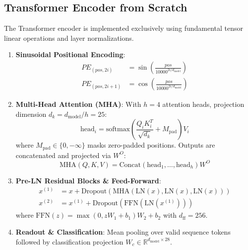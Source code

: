 \documentclass[10pt,twocolumn,letterpaper]{article}
\begin{document}
\subsection{Transformer Encoder from Scratch}
The Transformer encoder is implemented exclusively using fundamental tensor linear operations and layer normalizations.
\begin{enumerate}
    \item \textbf{Sinusoidal Positional Encoding}:
    \begin{align}
    PE_{(pos, 2i)} &= \sin\left(\frac{pos}{10000^{2i/d_{\text{model}}}}\right) \\
    PE_{(pos, 2i+1)} &= \cos\left(\frac{pos}{10000^{2i/d_{\text{model}}}}\right)
    \end{align}
    \item \textbf{Multi-Head Attention (MHA)}: With $h=4$ attention heads, projection dimension $d_k = d_{\text{model}}/h = 25$:
    \begin{equation}
    \text{head}_i = \text{softmax}\left(\frac{Q_i K_i^T}{\sqrt{d_k}} + M_{\text{pad}}\right) V_i
    \end{equation}
    where $M_{\text{pad}} \in \{0, -\infty\}$ masks zero-padded positions. Outputs are concatenated and projected via $W^O$:
    \begin{equation}
    \text{MHA}(Q, K, V) = \text{Concat}(\text{head}_1, \dots, \text{head}_h) W^O
    \end{equation}
    \item \textbf{Pre-LN Residual Blocks \& Feed-Forward}:
    \begin{align}
    x^{(1)} &= x + \text{Dropout}(\text{MHA}(\text{LN}(x), \text{LN}(x), \text{LN}(x))) \\
    x^{(2)} &= x^{(1)} + \text{Dropout}(\text{FFN}(\text{LN}(x^{(1)})))
    \end{align}
    where $\text{FFN}(z) = \max(0, z W_1 + b_1) W_2 + b_2$ with $d_{\text{ff}} = 256$.
    \item \textbf{Readout \& Classification}: Mean pooling over valid sequence tokens followed by classification projection $W_c \in \mathbb{R}^{d_{\text{model}} \times 28}$.
\end{enumerate}
\end{document}
